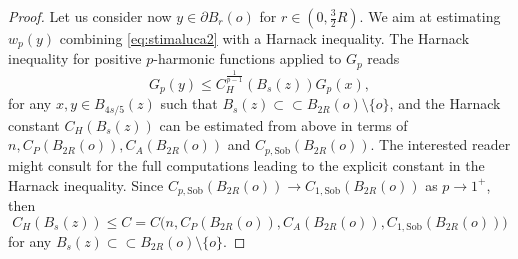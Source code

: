 \documentclass[a4paper,12pt,reqno]{amsart}
\numberwithin{equation}{section}
\theoremstyle{plain}
\theoremstyle{definition}
\theoremstyle{remark}
\begin{document}
{\begin{proof}
Let us consider now $y\in \partial B_r(o)$ for $r \in (0,\tfrac32 R)$. We aim at estimating $w_p(y)$ combining \eqref{eq:stimaluca2} with a Harnack inequality.
The Harnack inequality for positive $p$-harmonic functions \cite[Theorem 1.28]{salvatori-rigoli-vignati} applied to $G_p$ reads
\begin{equation}\label{eqn:LaBenedettaHarnack}
G_p(y) \leq C_H^{\frac{1}{p-1}}(B_s(z)) G_p(x),
\end{equation}
for any $x, y \in B_{4s/5}(z)$ such that $B_s(z)\subset\subset B_{2R}(o)\setminus\{o\}$, and the Harnack constant $C_H(B_s(z))$ can be estimated from above in terms of $n, C_P(B_{2R}(o)), C_A(B_{2R}(o))$ and $C_{p, \mathrm{Sob}}(B_{2R}(o))$. The interested reader might consult \cite[Theorem 3.4 and Remark 3.5]{mari_flowlaplaceapproximationnew_2022} for the full computations leading to the explicit constant in the Harnack inequality. 
Since $C_{p,\mathrm{Sob}}(B_{2R}(o))\to C_{1,\mathrm{Sob}}(B_{2R}(o))$ as $p\to 1^+$, then \[
C_H(B_s(z)) \le C=C\big(n, C_P(B_{2R}(o)), C_A(B_{2R}(o)), C_{1, \mathrm{Sob}}(B_{2R}(o)) \big)
\]
for any $B_s(z)\subset\subset B_{2R}(o)\setminus\{o\}$.


\end{proof}}
\end{document}
